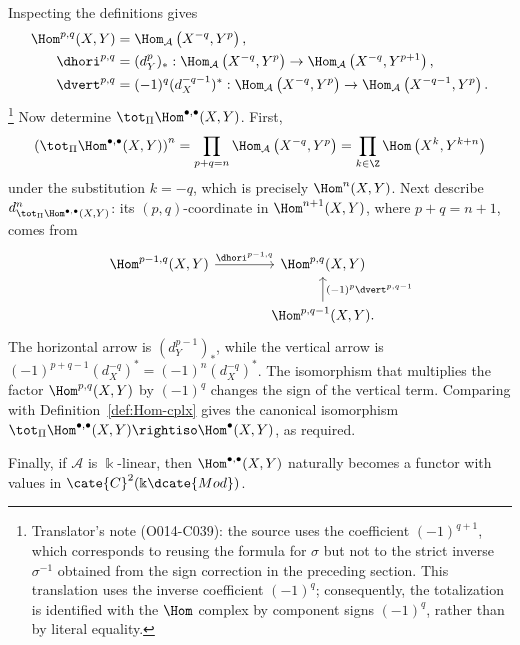 \begin{example}
	Inspecting the definitions gives
	\begin{equation*}\begin{aligned}
		\Hom^{p, q}(X, Y) & = \Hom_{\mathcal{A}}\left( X^{-q}, Y^p \right), \\
		\dhori^{p, q} & = (d_Y^p)_* : \Hom_{\mathcal{A}}\left( X^{-q}, Y^p \right) \to \Hom_{\mathcal{A}}\left( X^{-q}, Y^{p+1} \right), \\
		\dvert^{p, q} & = (-1)^q (d_X^{-q-1})^* : \Hom_{\mathcal{A}}\left( X^{-q}, Y^p \right) \to \Hom_{\mathcal{A}}\left( X^{-q-1}, Y^p \right).
	\end{aligned}\end{equation*}%
	\footnote{Translator's note (O014-C039): the source uses the coefficient
	$(-1)^{q+1}$, which corresponds to reusing the formula for $\sigma$ but
	not to the strict inverse $\sigma^{-1}$ obtained from the sign correction
	in the preceding section. This translation uses the inverse coefficient
	$(-1)^q$; consequently, the totalization is identified with the $\Hom$
	complex by component signs $(-1)^q$, rather than by literal equality.}
	Now determine $\tot_{\Pi}\Hom^{\bullet,\bullet}(X,Y)$. First,
	\[ \left(\tot_{\Pi} \Hom^{\bullet, \bullet}(X, Y)\right)^n = \prod_{p+q=n} \Hom_{\mathcal{A}}\left( X^{-q}, Y^p \right) = \prod_{k \in \Z} \Hom\left( X^k, Y^{k+n} \right) \]
	under the substitution $k=-q$, which is precisely $\Hom^n(X,Y)$. Next
	describe $d_{\tot_{\Pi}\Hom^{\bullet,\bullet}(X,Y)}^n$: its
	$(p,q)$-coordinate in $\Hom^{n+1}(X,Y)$, where $p+q=n+1$, comes from
	\[\begin{tikzcd}[column sep=large]
		\Hom^{p-1, q}(X, Y) \arrow[r, "{\dhori^{p-1, q}}"] & \Hom^{p, q}(X, Y) \\
		& \Hom^{p, q-1}(X, Y) \arrow[u, "{(-1)^p \dvert^{p, q-1}}"'] .
	\end{tikzcd}\]
	The horizontal arrow is $(d_Y^{p-1})_*$, while the vertical arrow is
	$(-1)^{p+q-1}(d_X^{-q})^*=(-1)^n(d_X^{-q})^*$. The isomorphism that
	multiplies the factor $\Hom^{p,q}(X,Y)$ by $(-1)^q$ changes the sign of
	the vertical term. Comparing with Definition~\ref{def:Hom-cplx} gives the
	canonical isomorphism
	$\tot_{\Pi}\Hom^{\bullet,\bullet}(X,Y)\rightiso\Hom^\bullet(X,Y)$, as
	required.

	Finally, if $\mathcal{A}$ is $\Bbbk$-linear, then
	$\Hom^{\bullet,\bullet}(X,Y)$ naturally becomes a functor with values in
	$\cate{C}^2(\Bbbk\dcate{Mod})$.
\end{example}
